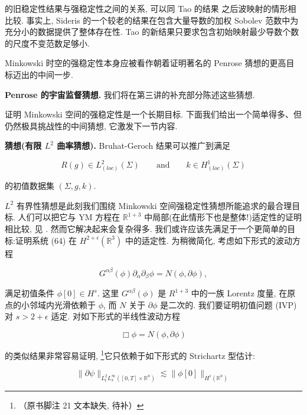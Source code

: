 \begin{remark}\label{rem:cG-3.7}
 的旧稳定性结果与强稳定性之间的关系, 可以同 Tao 的结果 \cite{gfref71} 之后波映射的情形相比较. 事实上, Sideris \cite{gfref63} 的一个较老的结果在包含大量导数的加权 Sobolev 范数中为充分小的数据提供了整体存在性. Tao 的新结果只要求包含初始映射最少导数个数的尺度不变范数足够小. 
\end{remark}

\begin{remark}\label{rem:cG-3.8}
Minkowski 时空的强稳定性本身应被看作朝着证明著名的 Penrose 猜想的更高目标迈出的中间一步. 

\textbf{Penrose 的宇宙监督猜想.} 我们将在第三讲的补充部分陈述这些猜想. 
\end{remark}

证明 Minkowski 空间的强稳定性是一个长期目标. 下面我们给出一个简单得多、但仍然极具挑战性的中间猜想, 它激发下一节内容. 

\textbf{猜想(有限 $L^2$ 曲率猜想).} Bruhat-Geroch 结果可以推广到满足

\[
R (g) \in L _ {(l o c)} ^ {2} (\Sigma) \qquad \mathrm{and} \qquad k \in H _ {(l o c)} ^ {1} (\Sigma)
\]

的初值数据集 $(\Sigma,  g,  k)$. 

$L^2$ 有界性猜想是此刻我们围绕 Minkowski 空间强稳定性猜想所能追求的最合理目标. 人们可以把它与 YM 方程在 $\mathbb{R}^{1 + 3}$ 中局部(在此情形下也是整体!)适定性的证明相比较, 见 \cite{gfref34}. 然而它解决起来会复杂得多. 我们或许应该先满足于一个更简单的目标:证明系统 (64) 在 $H^{2 + \epsilon}(\mathbb{R}^3)$ 中的适定性. 为稍微简化, 考虑如下形式的波动方程

\begin{equation}
G ^ {\alpha \beta} (\phi) \partial_ {\alpha} \partial_ {\beta} \phi = N (\phi ,  \partial \phi), \label{eq:cG-65}
\end{equation}

满足初值条件 $\phi[0]\in H^{s}$. 这里 $G^{\alpha\beta}(\phi)$ 是 $R^{1+3}$ 中的一族 Lorentz 度量, 在原点的小邻域内光滑依赖于 $\phi$, 而 $N$ 关于 $\partial\phi$ 是二次的. 我们要证明初值问题 (IVP) 对 $s>2+\epsilon$ 适定. 对如下形式的半线性波动方程

\[
\Box \phi = N (\phi ,  \partial \phi)
\]

的类似结果非常容易证明, \footnote{（原书脚注 21 文本缺失, 待补）}它只依赖于如下形式的 Strichartz 型估计:

\begin{equation}
\| \partial \psi \| _ {L _ {t} ^ {2} L _ {x} ^ {\infty} ([ 0,  T ] \times \mathbb {R} ^ {n})} \lesssim \| \phi [ 0 ] \| _ {H ^ {s} (\mathbb {R} ^ {n})}\label{eq:cG-66}
\end{equation}

